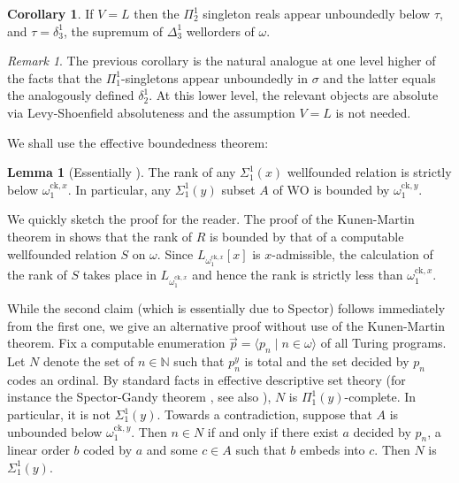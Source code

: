 \documentclass[a4paper,11pt]{amsart}
\theoremstyle{definition}
\newcommand{\WO}{\mathrm{WO}}
\newcommand{\ck}{\mathrm{ck}}
\newcommand{\NN}{\mathbb{N}}
\newtheorem{lemma}[fact]{Lemma}
\newtheorem{corollary}[fact]{Corollary}
\newtheorem*{problem A}{Problem 1}
\newtheorem*{problem B}{Problem 2}
\theoremstyle{remark}
\newtheorem{remark}[fact]{Remark}
\begin{document}
\begin{corollary} If $V=L$ then the $\Pi^1_{2}$ singleton reals appear unboundedly below $\tau$, and $\tau=\delta^{1}_{3}$, the supremum of $\Delta^{1}_{3}$ wellorders of $\omega$.
\end{corollary}

\begin{remark}
The previous corollary is the natural analogue at one level higher of the facts that the $\Pi^{1}_{1}$-singletons appear unboundedly in $\sigma$ and the latter equals the analogously defined $\delta^{1}_{2}$. 
At this lower level, the relevant objects are absolute via Levy-Shoenfield absoluteness and the assumption $V=L$ is not needed. 
\end{remark}

We shall use the effective boundedness theorem: 

\begin{lemma}[Essentially \cite{Sp55}]
\label{effective Sigma11 boundedness} 
The rank of any $\Sigma^1_1(x)$ wellfounded relation is strictly below $\omega_1^{\ck,x}$. 
In particular, any $\Sigma^1_1(y)$ subset $A$ of $\WO$ is bounded by $\omega_1^{\ck,y}$. 
\end{lemma} 

We quickly sketch the proof for the reader. 
The proof of the Kunen-Martin theorem in \cite[Theorem 31.1]{kechris2012classical} shows that the rank of $R$ is bounded by that of a computable wellfounded relation $S$ on $\omega$. 
Since $L_{\omega_1^{\ck,x}}[x]$ is $x$-admissible, the calculation of the rank of $S$ takes place in $L_{\omega_1^{\ck,x}}$ and hence the rank is strictly less than $\omega_1^{\ck,x}$. 

While the second claim (which is essentially due to Spector) follows immediately from the first one, we give an alternative proof without use of the Kunen-Martin theorem. 
Fix a computable enumeration $\vec{p}=\langle p_n\mid n\in\omega\rangle$ of all Turing programs. 
Let $N$ denote the set of $n\in\NN$ such that 
$p_n^y$ is total and the set decided by $p_n$ codes an ordinal. 
By standard facts in effective descriptive set theory (for instance the Spector-Gandy theorem \cite{Sp59, Ga}, see also 
\cite[Theorem 5.3]{Hjorth-Vienna-notes-on-descriptive-set-theory}), $N$ is $\Pi^1_1(y)$-complete.  
In particular, it is not $\Sigma^1_1(y)$. 
Towards a contradiction, suppose that $A$ is unbounded below $\omega_1^{\ck,y}$. 
Then $n\in N$ if and only if there exist $a$ decided by $p_n$, a linear order $b$ coded by $a$ and some $c\in A$ such that $b$ embeds into $c$. 
Then $N$ is $\Sigma^1_1(y)$. 
\end{document}
